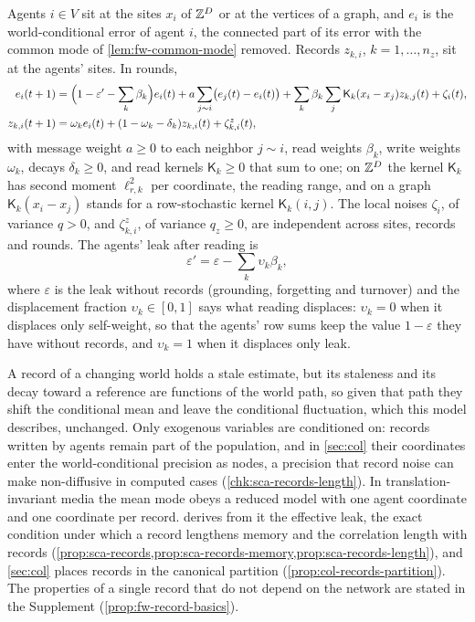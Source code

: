 \begin{definition}\label{def:fw-record-model}
Agents $i\in V$ sit at the sites $x_i$ of $\mathbb{Z}^D$ or at the vertices of a graph, and $e_i$ is the world-conditional error of agent $i$, the connected part of its error with the common mode of \cref{lem:fw-common-mode} removed. Records $z_{k,i}$, $k=1,\dots,n_z$, sit at the agents' sites. In rounds,
\begin{align}
e_i(t+1)&=\Bigl(1-\varepsilon'-\sum_k\beta_k\Bigr)e_i(t)+a\sum_{j\sim i}\bigl(e_j(t)-e_i(t)\bigr)+\sum_k\beta_k\sum_j\mathsf K_k(x_i-x_j)z_{k,j}(t)+\zeta_i(t),\label{eq:fw-record-agents}\\
z_{k,i}(t+1)&=\omega_ke_i(t)+(1-\omega_k-\delta_k)z_{k,i}(t)+\zeta^z_{k,i}(t),\label{eq:fw-record-records}
\end{align}
with message weight $a\ge0$ to each neighbor $j\sim i$, read weights $\beta_k$, write weights $\omega_k$, decays $\delta_k\ge0$, and read kernels $\mathsf K_k\ge0$ that sum to one; on $\mathbb{Z}^D$ the kernel $\mathsf K_k$ has second moment $\ell_{r,k}^2$ per coordinate, the reading range, and on a graph $\mathsf K_k(x_i-x_j)$ stands for a row-stochastic kernel $\mathsf K_k(i,j)$. The local noises $\zeta_i$, of variance $q>0$, and $\zeta^z_{k,i}$, of variance $q_z\ge0$, are independent across sites, records and rounds. The agents' leak after reading is
\begin{equation}\label{eq:fw-record-leak}
\varepsilon'=\varepsilon-\sum_k\upsilon_k\beta_k,
\end{equation}
where $\varepsilon$ is the leak without records (grounding, forgetting and turnover) and the displacement fraction $\upsilon_k\in[0,1]$ says what reading displaces: $\upsilon_k=0$ when it displaces only self-weight, so that the agents' row sums keep the value $1-\varepsilon$ they have without records, and $\upsilon_k=1$ when it displaces only leak.
\end{definition}

A record of a changing world holds a stale estimate, but its staleness and its decay toward a reference are functions of the world path, so given that path they shift the conditional mean and leave the conditional fluctuation, which this model describes, unchanged. Only exogenous variables are conditioned on: records written by agents remain part of the population, and in \cref{sec:col} their coordinates enter the world-conditional precision as nodes, a precision that record noise can make non-diffusive in computed cases (\cref{chk:sca-records-length}). In translation-invariant media the mean mode obeys a reduced model with one agent coordinate and one coordinate per record.  derives from it the effective leak, the exact condition under which a record lengthens memory and the correlation length with records (\cref{prop:sca-records,prop:sca-records-memory,prop:sca-records-length}), and \cref{sec:col} places records in the canonical partition (\cref{prop:col-records-partition}). The properties of a single record that do not depend on the network are stated in the Supplement (\cref{prop:fw-record-basics}).

